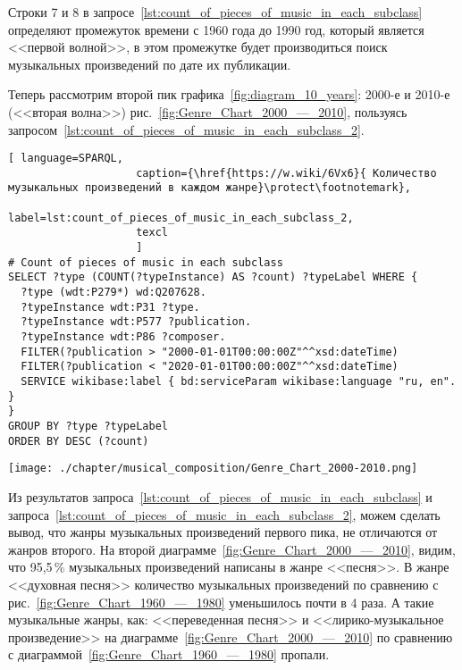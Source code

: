 Строки 7 и 8 в запросе~\ref{lst:count_of_pieces_of_music_in_each_subclass} определяют промежуток времени с 1960 года до 1990 год, который является <<первой волной>>, в этом промежутке будет производиться поиск музыкальных произведений по дате их публикации.


Теперь рассмотрим второй пик графика~\ref{fig:diagram_10_years}: 2000-е и 2010-е (<<вторая волна>>) рис.~\ref{fig:Genre_Chart_2000_—_2010}, пользуясь запросом~\ref{lst:count_of_pieces_of_music_in_each_subclass_2}.

\begin{lstlisting}[ language=SPARQL,
                    caption={\href{https://w.wiki/6Vx6}{ Количество музыкальных произведений в каждом жанре}\protect\footnotemark},
                    label=lst:count_of_pieces_of_music_in_each_subclass_2,
                    texcl 
                    ]
# Count of pieces of music in each subclass
SELECT ?type (COUNT(?typeInstance) AS ?count) ?typeLabel WHERE {
  ?type (wdt:P279*) wd:Q207628.
  ?typeInstance wdt:P31 ?type.
  ?typeInstance wdt:P577 ?publication.
  ?typeInstance wdt:P86 ?composer.
  FILTER(?publication > "2000-01-01T00:00:00Z"^^xsd:dateTime)        
  FILTER(?publication < "2020-01-01T00:00:00Z"^^xsd:dateTime)
  SERVICE wikibase:label { bd:serviceParam wikibase:language "ru, en". }
}
GROUP BY ?type ?typeLabel
ORDER BY DESC (?count)
\end{lstlisting}%

\begin{marginfigure}[0\baselineskip]
	\texttt{[image: ./chapter/musical\_composition/Genre\_Chart\_2000-2010.png]}
	\caption[Круговая диаграмма музыкальных жанров за 2000--2010 годы во всем мире]{Круговая диаграмма музыкальных жанров за 2000--2010 годы во всем мире. Ссылка на SPARQL-запрос: \href{https://w.wiki/6Vx6}{https://w.wiki/6Vx6}.}%
	\label{fig:Genre_Chart_2000_—_2010}%
\end{marginfigure}

Из результатов запроса~\ref{lst:count_of_pieces_of_music_in_each_subclass} и запроса~\ref{lst:count_of_pieces_of_music_in_each_subclass_2}, можем сделать вывод, что жанры музыкальных произведений первого пика, не отличаются от жанров второго. На второй диаграмме~\ref{fig:Genre_Chart_2000_—_2010}, видим, что 95,5\,\% музыкальных произведений написаны в жанре <<песня>>. В жанре <<духовная песня>> количество музыкальных произведений по сравнению с рис.~\ref{fig:Genre_Chart_1960_—_1980} уменьшилось почти в 4 раза. А такие музыкальные жанры, как: <<переведенная песня>> и <<лирико-музыкальное произведение>> на диаграмме~\ref{fig:Genre_Chart_2000_—_2010} по сравнению с диаграммой~\ref{fig:Genre_Chart_1960_—_1980} пропали.

